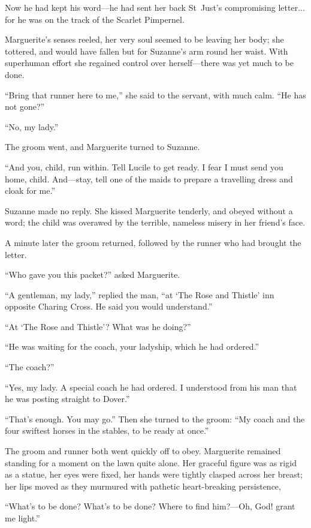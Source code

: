 Now he had kept his word---he had sent her back St~Just's compromising letter... for he was on the track of the Scarlet Pimpernel.

Marguerite's senses reeled, her very soul seemed to be leaving her body; she tottered, and would have fallen but for Suzanne's arm round her waist. With superhuman effort she regained control over herself---there was yet much to be done.

\enquote{Bring that runner here to me,} she said to the servant, with much calm. \enquote{He has not gone?}

\enquote{No, my lady.}

The groom went, and Marguerite turned to Suzanne.

\enquote{And you, child, run within. Tell Lucile to get ready. I fear I must send you home, child. And---stay, tell one of the maids to prepare a travelling dress and cloak for me.}

Suzanne made no reply. She kissed Marguerite tenderly, and obeyed without a word; the child was overawed by the terrible, nameless misery in her friend's face.

A minute later the groom returned, followed by the runner who had brought the letter.

\enquote{Who gave you this packet?} asked Marguerite.

\enquote{A gentleman, my lady,} replied the man, \enquote{at \enquote{The Rose and Thistle} inn opposite Charing Cross. He said you would understand.}

\enquote{At \enquote{The Rose and Thistle}? What was he doing?}

\enquote{He was waiting for the coach, your ladyship, which he had ordered.}

\enquote{The coach?}

\enquote{Yes, my lady. A special coach he had ordered. I understood from his man that he was posting straight to Dover.}

\enquote{That's enough. You may go.} Then she turned to the groom: \enquote{My coach and the four swiftest horses in the stables, to be ready at once.}

The groom and runner both went quickly off to obey. Marguerite remained standing for a moment on the lawn quite alone. Her graceful figure was as rigid as a statue, her eyes were fixed, her hands were tightly clasped across her breast; her lips moved as they murmured with pathetic heart-breaking persistence,\longdash


\enquote{What's to be done? What's to be done? Where to find him?---Oh, God! grant me light.}

